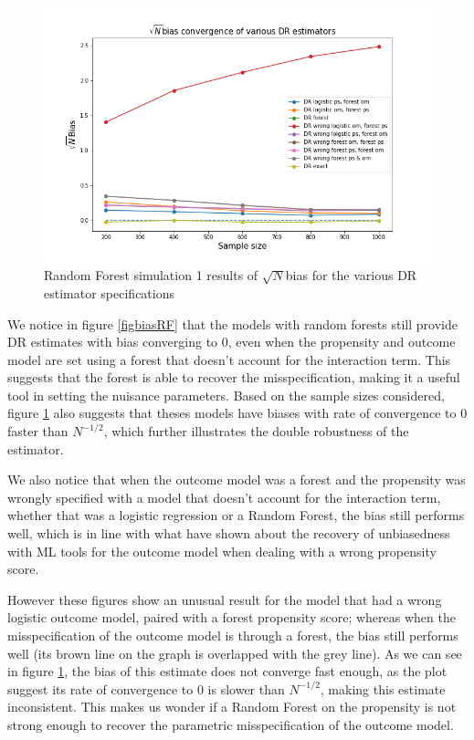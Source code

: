 \documentclass[12pt,twoside]{article}
\begin{document}
\begin{figure} 
    \centering
    \includegraphics[width = 0.9\columnwidth]{figures/sqrtnRF.png}
    \caption{Random Forest simulation 1 results of $\sqrt{N}$bias for the various DR estimator specifications}
    \label{figsqrtnRF}
\end{figure}

We notice in figure \ref{figbiasRF} that the models with random forests still provide DR estimates with bias converging to 0, even when the propensity and outcome model are set using a forest that doesn't account for the interaction term. This suggests that the forest is able to recover the misspecification, making it a useful tool in setting the nuisance parameters. Based on the sample sizes considered, figure \ref{figsqrtnRF} also suggests that theses models have biases with rate of convergence to 0 faster than $N^{-1/2}$, which further illustrates the double robustness of the estimator.

We also notice that when the outcome model was a forest and the propensity was wrongly specified with a model that doesn't account for the interaction term, whether that was a logistic regression or a Random Forest, the bias still performs well, which is in line with what \citet{ps_SL} have shown about the recovery of unbiasedness with ML tools for the outcome model when dealing with a wrong propensity score. 

However these figures show an unusual result for the model that had a wrong logistic outcome model, paired with a forest propensity score;  whereas when the misspecification of the outcome model is through a forest, the bias still performs well (its brown line on the graph is overlapped with the grey line). As we can see in figure \ref{figsqrtnRF}, the bias of this estimate does not converge fast enough, as the plot suggest its rate of convergence to 0 is slower than $N^{-1/2}$, making this estimate inconsistent. This makes us wonder if a Random Forest on the propensity is not strong enough to recover the parametric misspecification of the outcome model.
\end{document}
